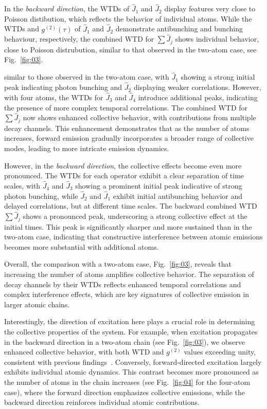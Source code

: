 \documentclass[aps,prl,twocolumn,superscriptaddress,showpacs,amsmath,amssymb]{revtex4-2}
\begin{document}
In the \textit{backward direction}, the WTDs of $ \hat{J}_1 $ and $ \hat{J}_2 $ display features very close to Poisson distibution, which reflects the behavior of individual atoms.
While the WTDs and $g^{(2)}(\tau)$ of $ \hat{J}_1 $ and $ \hat{J}_2 $ demonstrate antibunching and bunching behaviour, respectively, the combined WTD for $ \sum \hat{J}_j $ shows individual behavior, close to Poisson distrubution, similar to that observed in the two-atom case, see Fig.~\ref{fig:03}.

similar to those observed in the two-atom case, with $ \hat{J}_1 $ showing a strong initial peak indicating photon bunching and $ \hat{J}_2 $ displaying weaker correlations. However, with four atoms, the WTDs for $ \hat{J}_3 $ and $ \hat{J}_4 $ introduce additional peaks, indicating the presence of more complex temporal correlations. The combined WTD for $ \sum \hat{J}_j $ now shows enhanced collective behavior, with contributions from multiple decay channels. This enhancement demonstrates that as the number of atoms increases, forward emission gradually incorporates a broader range of collective modes, leading to more intricate emission dynamics.

However, in the \textit{backward direction}, the collective effects become even more pronounced. The WTDs for each operator exhibit a clear separation of time scales, with $ \hat{J}_4 $ and $\hat{J}_3$ showing a prominent initial peak indicative of strong photon bunching, while $\hat{J}_2$ and $
\hat{J}_1 $ exhibit initial antibunching behavior and delayed correlations, but at different time scales. The backward combined WTD $ \sum \hat{J}_j $ shows a pronounced peak, underscoring a strong collective effect at the initial times. This peak is significantly sharper and more sustained than in the two-atom case, indicating that constructive interference between atomic emissions becomes more substantial with additional atoms.

Overall, the comparison with a two-atom case, Fig.~\ref{fig:03}, reveals that increasing the number of atoms amplifies collective behavior. The separation of decay channels by their WTDs reflects enhanced temporal correlations and complex interference effects, which are key signatures of collective emission in larger atomic chains.

Interestingly, the direction of excitation here plays a crucial role in determining the collective properties of the system. For example, when excitation propagates in the backward direction in a two-atom chain (see Fig.~\ref{fig:03}), we observe enhanced collective behavior, with both WTD and $ g^{(2)}$ values exceeding unity, consistent with previous findings~\cite{masson2022universality}. Conversely, forward-directed excitation largely exhibits individual atomic dynamics. This contrast becomes more pronounced as the number of atoms in the chain increases (see Fig.~\ref{fig:04} for the four-atom case), where the forward direction emphasizes collective emissions, while the backward direction reinforces individual atomic contributions.
\end{document}
